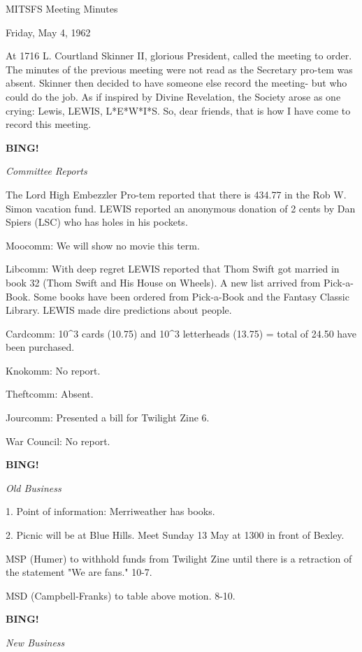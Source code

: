 \documentclass[12pt]{article}
\newcommand{\bing}{{\bf BING!} }
\newcommand{\goto}[1]{\bing \vskip 12pt \centerline{{\em{#1}}}}
\begin{document}
\begin{center}

MITSFS Meeting Minutes

Friday, May 4, 1962

\end{center}
 
\vspace{12pt}

\setlength{\parskip}{6pt}

\noindent
At 1716 L. Courtland Skinner II, glorious President, called the meeting to order. The minutes of the previous meeting were not read as the Secretary pro-tem was absent. Skinner then decided to have someone else record the meeting- but who could do the job. As if inspired by Divine Revelation, the Society arose as one crying: Lewis, LEWIS, L*E*W*I*S. So, dear friends, that is how I have come to record this meeting.

\goto{Committee Reports}

The Lord High Embezzler Pro-tem reported that there is 434.77 in the Rob W. Simon vacation fund. LEWIS reported an anonymous donation of 2 cents by Dan Spiers (LSC) who has holes in his pockets.

Moocomm: We will show no movie this term.

Libcomm: With deep regret LEWIS reported that Thom Swift got married in book 32 (Thom Swift and His House on Wheels). A new list arrived from Pick-a-Book. Some books have been ordered from Pick-a-Book and the Fantasy Classic Library. LEWIS made dire predictions about people.

Cardcomm: 10^3 cards (10.75) and 10^3 letterheads (13.75) = total of 24.50 have been purchased.

Knokomm: No report.

Theftcomm: Absent.

Jourcomm: Presented a bill for Twilight Zine 6.

War Council: No report.

\goto{Old Business}

1. Point of information: Merriweather has books.

2. Picnic will be at Blue Hills. Meet Sunday 13 May at 1300 in front of Bexley.

MSP (Humer) to withhold funds from Twilight Zine until there is a retraction of the statement "We are fans." 10-7.

MSD (Campbell-Franks) to table above motion. 8-10.

\goto{New Business}
\end{document}
